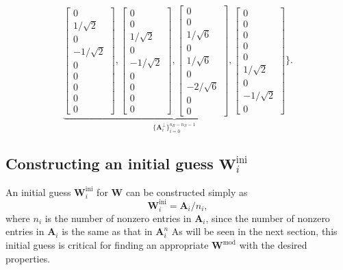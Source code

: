 \begin{equation}
	\underbrace{\begin{bmatrix} 0\\ 1/\sqrt{2}\\ 0\\ -1/\sqrt{2}\\ 0\\ 0\\ 0\\ 0\\ 0 \end{bmatrix},
		\begin{bmatrix} 0\\ 0\\ 1/\sqrt{2}\\ 0\\ -1/\sqrt{2}\\ 0\\ 0\\ 0\\ 0 \end{bmatrix},
		\begin{bmatrix} 0\\ 0\\ 1/\sqrt{6}\\ 0\\ 1/\sqrt{6}\\ 0\\ -2/\sqrt{6}\\ 0\\ 0 \end{bmatrix},
		\begin{bmatrix} 0\\ 0\\ 0\\ 0\\ 0\\ 1/\sqrt{2}\\ 0\\ -1/\sqrt{2}\\ 0 \end{bmatrix}}_{\{\mathbf{A}^\perp_i\}_{i=0}^{n_B-n_N-1}}
	\Biggr\}.
\end{equation}

\subsection{Constructing an initial guess $\mathbf{W}^\text{ini}_i$}
An initial guess $\mathbf{W}^\text{ini}_i$ for $\mathbf{W}$ can be constructed simply as
\begin{equation}
	\mathbf{W}^\text{ini}_i=\mathbf{A}_i/n_i,\label{eq:initial_guess}
\end{equation}
where $n_i$ is the number of nonzero entries in $\mathbf{A}_i$, since the number of nonzero entries in $\mathbf{A}_i$ is the same as that in $\mathbf{A}^n_i$ As will be seen in the next section, this initial guess is critical for finding an appropriate $\mathbf{W}^\text{mod}$ with the desired properties.

